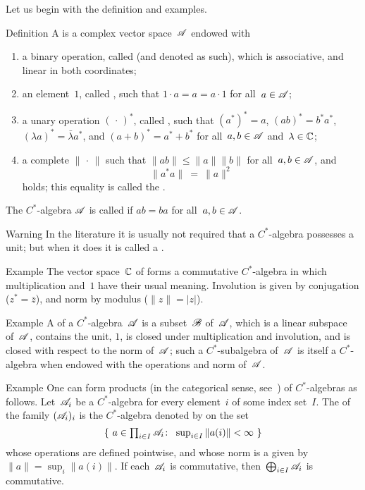 \documentclass[a]{subfiles}
\begin{document}
Let us begin with the definition
and examples.
\begin{parsec}%
\begin{point}{Definition}%
A 
is a complex vector space~$\mathscr{A}$
endowed with
\begin{enumerate}
\item
a binary operation,
called 
(and denoted as such),
which is associative, and linear in both coordinates;
\item
an element~$1$, called ,
such that $1\cdot a = a = a\cdot 1$
for all~$a\in \mathscr{A}$;
\item
a unary operation $(\,\cdot\,)^*$,
called ,
such that $(a^*)^*=a$,
$(ab)^*=b^*a^*$,
$(\lambda a)^* = \bar\lambda a^*$,
and $(a+b)^* = a^*+b^*$
for all~$a,b\in\mathscr{A}$ and~$\lambda\in \mathbb{C}$;
\item
a complete  $\|\,\cdot\,\|$
such that
$\|ab\|\leq\|a\|\|b\|$
for all~$a,b\in\mathscr{A}$,
and 
\begin{equation*}
\label{eq:Cstar-identity}
\|a^*a\|\ =\ \|a\|^2
\end{equation*}
holds; this equality is called the .
\end{enumerate}
The $C^*$-algebra $\mathscr{A}$ is called 
if $ab=ba$ for all~$a,b\in\mathscr{A}$.
\begin{point}{Warning}%
In the literature it is usually not
required that a $C^*$-algebra
possesses a unit; but when it does it is called
a .
\end{point}
\end{point}
\begin{point}{Example}%
The vector space~$\mathbb{C}$ of 
forms a commutative  $C^*$-algebra
in which
multiplication and~$1$
have their usual meaning.
Involution is given by conjugation ($z^*=\bar{z}$),
and norm by modulus ($\|z\|=|z|$).
\end{point}
\begin{point}{Example}%
A 
of a $C^*$-algebra~$\mathscr{A}$
is a subset~$\mathscr{B}$ of~$\mathscr{A}$,
which is a linear subspace of~$\mathscr{A}$,
contains the unit, $1$, is closed under multiplication
and involution, 
and is closed with respect to the norm of~$\mathscr{A}$;
such a $C^*$-subalgebra of~$\mathscr{A}$
is itself a $C^*$-algebra
when endowed with the operations and norm
of~$\mathscr{A}$.
\end{point}
\begin{point}{Example}%
One can form products (in the categorical sense,
see~) of $C^*$-algebras as follows.
Let~$\mathscr{A}_i$ be a $C^*$-algebra
for every element~$i$ of some index set~$I$.
The 
of the family $(\mathscr{A}_i)_i$
is the $C^*$-algebra
denoted by  on the set
\begin{equation*}
\textstyle
\{\  a\in \prod_{i\in I}\mathscr{A}_i\colon\  \sup_{i \in I} \|a(i)\|< \infty \ \}
\end{equation*}
whose operations are defined pointwise,
and whose norm is a  given by $\|a\|=\sup_{i}\|a(i)\|$.
If each~$\mathscr{A}_i$ is commutative,
then~$\bigoplus_{i\in I}\mathscr{A}_i$
is commutative.


\end{point}
\end{parsec}
\end{document}
